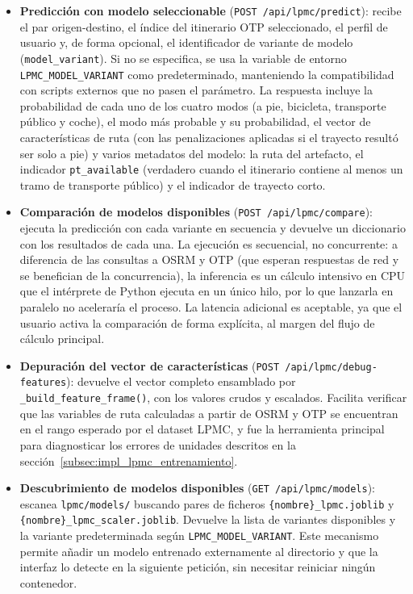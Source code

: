 \begin{itemize}
  \item \textbf{Predicción con modelo seleccionable} (\texttt{POST /api/lpmc/predict}): recibe el par origen-destino, el índice del itinerario OTP seleccionado, el perfil de usuario y, de forma opcional, el identificador de variante de modelo (\texttt{model\_variant}). Si no se especifica, se usa la variable de entorno \texttt{LPMC\_MODEL\_VARIANT} como predeterminado, manteniendo la compatibilidad con scripts externos que no pasen el parámetro. La respuesta incluye la probabilidad de cada uno de los cuatro modos (a pie, bicicleta, transporte público y coche), el modo más probable y su probabilidad, el vector de características de ruta (con las penalizaciones aplicadas si el trayecto resultó ser solo a pie) y varios metadatos del modelo: la ruta del artefacto, el indicador \texttt{pt\_available} (verdadero cuando el itinerario contiene al menos un tramo de transporte público) y el indicador de trayecto corto.

  \item \textbf{Comparación de modelos disponibles} (\texttt{POST /api/lpmc/compare}): ejecuta la predicción con cada variante en secuencia y devuelve un diccionario con los resultados de cada una. La ejecución es secuencial, no concurrente: a diferencia de las consultas a OSRM y OTP (que esperan respuestas de red y se benefician de la concurrencia), la inferencia es un cálculo intensivo en CPU que el intérprete de Python ejecuta en un único hilo, por lo que lanzarla en paralelo no aceleraría el proceso. La latencia adicional es aceptable, ya que el usuario activa la comparación de forma explícita, al margen del flujo de cálculo principal.

  \item \textbf{Depuración del vector de características} (\texttt{POST /api/lpmc/debug-features}): devuelve el vector completo ensamblado por \texttt{\_build\_feature\_frame()}, con los valores crudos y escalados. Facilita verificar que las variables de ruta calculadas a partir de OSRM y OTP se encuentran en el rango esperado por el dataset LPMC, y fue la herramienta principal para diagnosticar los errores de unidades descritos en la sección~\ref{subsec:impl_lpmc_entrenamiento}.

  \item \textbf{Descubrimiento de modelos disponibles} (\texttt{GET /api/lpmc/models}): escanea \texttt{lpmc/models/} buscando pares de ficheros \texttt{\{nombre\}\_lpmc.joblib} y \texttt{\{nombre\}\_lpmc\_scaler.joblib}. Devuelve la lista de variantes disponibles y la variante predeterminada según \texttt{LPMC\_MODEL\_VARIANT}. Este mecanismo permite añadir un modelo entrenado externamente al directorio y que la interfaz lo detecte en la siguiente petición, sin necesitar reiniciar ningún contenedor.
\end{itemize}


